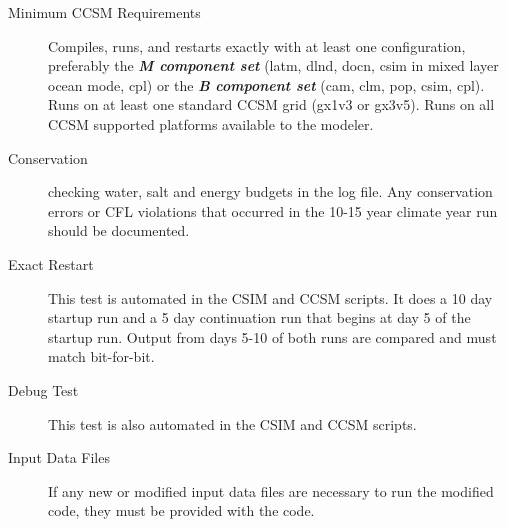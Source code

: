 \begin{description}

  \item [Minimum CCSM Requirements] Compiles, runs, and restarts exactly with
                        at least one configuration, preferably the 
                        {\bf \textsl{M component set}} (latm, dlnd, docn, csim in mixed
                        layer ocean mode, cpl) or the
                        {\bf \textsl{B component set}} (cam, clm, pop, csim, cpl).
              Runs on at least one standard CCSM grid (gx1v3 or gx3v5).
             Runs on all CCSM supported platforms available to the modeler.

  \item [Conservation] checking water, salt and energy budgets in the log file.
        Any conservation errors or CFL violations that occurred in the 10-15 year
        climate year run should be documented.

  \item [Exact Restart] This test is automated in the CSIM and CCSM scripts.
                       It does a 10 day startup run and a 5 day continuation
                       run that begins at day 5 of the startup run. Output from
                       days 5-10 of both runs are compared and must match bit-for-bit.

  \item [Debug Test] This test is also automated in the CSIM and CCSM scripts.

  \item[Input Data Files] If any new or modified input data files are necessary to
                          run the modified code, they must be provided with the code.
\end{description}
